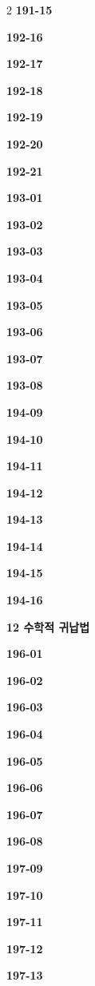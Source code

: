 \documentclass[10pt,a4paper]{article}
\begin{document}
\begin{multicols}{2}
\noindent\textbf{191-15}\ \par
\noindent\textbf{192-16}\ \par
\noindent\textbf{192-17}\ \par
\noindent\textbf{192-18}\ \par
\noindent\textbf{192-19}\ \par
\noindent\textbf{192-20}\ \par
\noindent\textbf{192-21}\ \par
\noindent\textbf{193-01}\ \par
\noindent\textbf{193-02}\ \par
\noindent\textbf{193-03}\ \par
\noindent\textbf{193-04}\ \par
\noindent\textbf{193-05}\ \par
\noindent\textbf{193-06}\ \par
\noindent\textbf{193-07}\ \par
\noindent\textbf{193-08}\ \par
\noindent\textbf{194-09}\ \par
\noindent\textbf{194-10}\ \par
\noindent\textbf{194-11}\ \par
\noindent\textbf{194-12}\ \par
\noindent\textbf{194-13}\ \par
\noindent\textbf{194-14}\ \par
\noindent\textbf{194-15}\ \par
\noindent\textbf{194-16}\ \par
\noindent\textbf{12 수학적 귀납법}\par\smallskip
\noindent\textbf{196-01}\ \par
\noindent\textbf{196-02}\ \par
\noindent\textbf{196-03}\ \par
\noindent\textbf{196-04}\ \par
\noindent\textbf{196-05}\ \par
\noindent\textbf{196-06}\ \par
\noindent\textbf{196-07}\ \par
\noindent\textbf{196-08}\ \par
\noindent\textbf{197-09}\ \par
\noindent\textbf{197-10}\ \par
\noindent\textbf{197-11}\ \par
\noindent\textbf{197-12}\ \par
\noindent\textbf{197-13}\ \par

\end{multicols}
\end{document}
